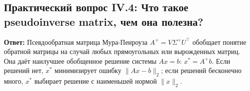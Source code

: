\subsection{Практический вопрос IV.4: Что такое pseudoinverse matrix, чем она полезна?}
\textbf{Ответ:} Псевдообратная матрица Мура-Пенроуза $A^+ = V \Sigma^+ U^\top$ обобщает понятие обратной матрицы на
случай любых прямоугольных или вырожденных матриц.
Она даёт наилучшее обобщенное решение системы $Ax = b$: $x^* = A^+ b$.
Если решений нет, $x^*$ минимизирует ошибку $\|Ax - b\|_2$; если решений бесконечно много, $x^*$ выбирает решение с
наименьшей нормой $\|x\|_2$.

\newpage

